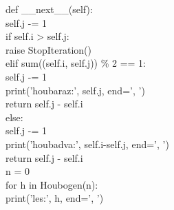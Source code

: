 \documentclass[addpoints,12pt]{exam}
\begin{document}
\begin{questions}
{\hspace*{0.6cm}def \_{}\_{}next\_{}\_{}(self):\\
\hspace*{0.6cm}\hspace*{0.6cm}self.j -= 1\\
\hspace*{0.6cm}\hspace*{0.6cm}if self.i \textgreater{} self.j:\\
\hspace*{0.6cm}\hspace*{0.6cm}\hspace*{0.6cm}raise StopIteration()\\
\hspace*{0.6cm}\hspace*{0.6cm}elif sum((self.i, self.j)) \%{} 2 == 1:\\
\hspace*{0.6cm}\hspace*{0.6cm}\hspace*{0.6cm}self.j -= 1\\
\hspace*{0.6cm}\hspace*{0.6cm}\hspace*{0.6cm}print('houbaraz:', self.j, end=', ')\\
\hspace*{0.6cm}\hspace*{0.6cm}\hspace*{0.6cm}return self.j - self.i\\
\hspace*{0.6cm}\hspace*{0.6cm}else:\\
\hspace*{0.6cm}\hspace*{0.6cm}\hspace*{0.6cm}self.j -= 1\\
\hspace*{0.6cm}\hspace*{0.6cm}\hspace*{0.6cm}print('houbadva:', self.i-self.j, end=', ')\\
\hspace*{0.6cm}\hspace*{0.6cm}\hspace*{0.6cm}return self.j - self.i\\
n = 0\\
for h in Houbogen(n):\\
\hspace*{0.6cm}print('les:', h, end=', ')}

\end{questions}
\end{document}
